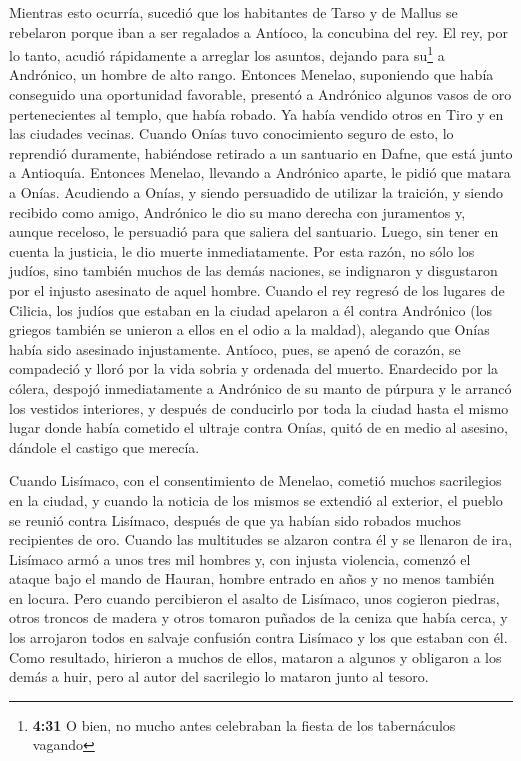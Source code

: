  Mientras esto ocurría, sucedió que los habitantes de
Tarso y de Mallus se rebelaron porque iban a ser regalados a Antíoco, la
concubina del rey.  El rey, por lo tanto, acudió
rápidamente a arreglar los asuntos, dejando para su\footnote{\textbf{4:31}
  O bien, no mucho antes celebraban la fiesta de los tabernáculos
  vagando} a Andrónico, un hombre de alto rango. 
Entonces Menelao, suponiendo que había conseguido una oportunidad
favorable, presentó a Andrónico algunos vasos de oro pertenecientes al
templo, que había robado. Ya había vendido otros en Tiro y en las
ciudades vecinas.  Cuando Onías tuvo conocimiento seguro
de esto, lo reprendió duramente, habiéndose retirado a un santuario en
Dafne, que está junto a Antioquía.  Entonces Menelao,
llevando a Andrónico aparte, le pidió que matara a Onías. Acudiendo a
Onías, y siendo persuadido de utilizar la traición, y siendo recibido
como amigo, Andrónico le dio su mano derecha con juramentos y, aunque
receloso, le persuadió para que saliera del santuario. Luego, sin tener
en cuenta la justicia, le dio muerte inmediatamente.  Por
esta razón, no sólo los judíos, sino también muchos de las demás
naciones, se indignaron y disgustaron por el injusto asesinato de aquel
hombre.  Cuando el rey regresó de los lugares de Cilicia,
los judíos que estaban en la ciudad apelaron a él contra Andrónico (los
griegos también se unieron a ellos en el odio a la maldad), alegando que
Onías había sido asesinado injustamente.  Antíoco, pues,
se apenó de corazón, se compadeció y lloró por la vida sobria y ordenada
del muerto.  Enardecido por la cólera, despojó
inmediatamente a Andrónico de su manto de púrpura y le arrancó los
vestidos interiores, y después de conducirlo por toda la ciudad hasta el
mismo lugar donde había cometido el ultraje contra Onías, quitó de en
medio al asesino, dándole el castigo que merecía.

 Cuando Lisímaco, con el consentimiento de Menelao,
cometió muchos sacrilegios en la ciudad, y cuando la noticia de los
mismos se extendió al exterior, el pueblo se reunió contra Lisímaco,
después de que ya habían sido robados muchos recipientes de oro.
 Cuando las multitudes se alzaron contra él y se llenaron
de ira, Lisímaco armó a unos tres mil hombres y, con injusta violencia,
comenzó el ataque bajo el mando de Hauran, hombre entrado en años y no
menos también en locura.  Pero cuando percibieron el
asalto de Lisímaco, unos cogieron piedras, otros troncos de madera y
otros tomaron puñados de la ceniza que había cerca, y los arrojaron
todos en salvaje confusión contra Lisímaco y los que estaban con él.
 Como resultado, hirieron a muchos de ellos, mataron a
algunos y obligaron a los demás a huir, pero al autor del sacrilegio lo
mataron junto al tesoro.

